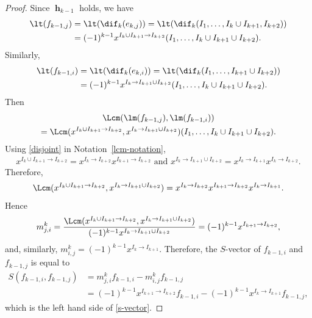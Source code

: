 \begin{proof}
Since $\mbfh_{k-1}$ holds, we have
\begin{align*}
\lt(f_{k-1,j})&=\lt(\dif_{k}(e_{k,j}))=\lt(\dif_{k}(I_1,\ldots,I_{k}\cup
I_{k+1},I_{k+2}))\\
&= (-1)^{k-1}x^{I_{k}\cup I_{k+1}\to I_{k+2}}(I_1,\ldots
,I_{k}\cup I_{k+1}\cup I_{k+2}).
\end{align*}
Similarly,
\begin{align*}
\lt(f_{k-1,i})&=\lt(\dif_{k}(e_{k,i}))=\lt(\dif_{k}(I_1,\ldots,
I_{k+1}\cup I_{k+2}))\\
&= (-1)^{k-1}x^{I_{k}\to I_{k+1}\cup I_{k+2}}(I_1,\ldots
,I_{k}\cup I_{k+1}\cup I_{k+2}).
\end{align*}
Then 
\begin{multline*}
\Lcm(\lm(f_{k-1,j}),\lm(f_{k-1,i}))\\
= \Lcm(x^{I_{k}\cup I_{k+1}\to
  I_{k+2}},x^{I_{k}\to I_{k+1}\cup I_{k+2}})(I_1,\ldots ,I_{k}\cup
I_{k+1}\cup I_{k+2}).
\end{multline*}
Using \eqref{disjoint} in Notation~\ref{lcm-notation},
\begin{eqnarray*}
x^{I_{k}\cup I_{k+1}\to I_{k+2}}=x^{I_{k}\to I_{k+2}}x^{I_{k+1}\to
  I_{k+2}}\mbox{ and } x^{I_{k}\to I_{k+1}\cup I_{k+2}}=x^{I_{k}\to
  I_{k+1}}x^{I_{k}\to I_{k+2}}.
\end{eqnarray*}
Therefore,
\begin{eqnarray*}
\Lcm(x^{I_{k}\cup I_{k+1}\to I_{k+2}},x^{I_{k}\to I_{k+1}\cup
  I_{k+2}})=x^{I_{k}\to I_{k+2}}x^{I_{k+1}\to I_{k+2}}x^{I_{k}\to I_{k+1}}.
\end{eqnarray*}
Hence
\begin{eqnarray*}
m^{k}_{j,i}= \frac{\Lcm(x^{I_{k}\cup I_{k+1}\to
    I_{k+2}},x^{I_{k}\to I_{k+1}\cup
    I_{k+2}})}{(-1)^{k-1}x^{I_{k}\to I_{k+1}\cup
    I_{k+2}}}=(-1)^{k-1}x^{I_{k+1}\to I_{k+2}},
\end{eqnarray*}
and, similarly, $m^{k}_{i,j}=(-1)^{k-1}x^{I_{k}\to
  I_{k+1}}$. Therefore, the $S$-vector of $f_{k-1,i}$ and $f_{k-1,j}$ is
equal to
\begin{align*}
 S(f_{k-1,i},f_{k-1,j})&=m^{k}_{j,i}f_{k-1,i}-m^{k}_{i,j}f_{k-1,j}\\
&= (-1)^{k-1}x^{I_{k+1}\to
  I_{k+2}}f_{k-1,i}-(-1)^{k-1}x^{I_{k}\to I_{k+1}}f_{k-1,j},
\end{align*}
which is the left hand side of \eqref{s-vector}.


\end{proof}
